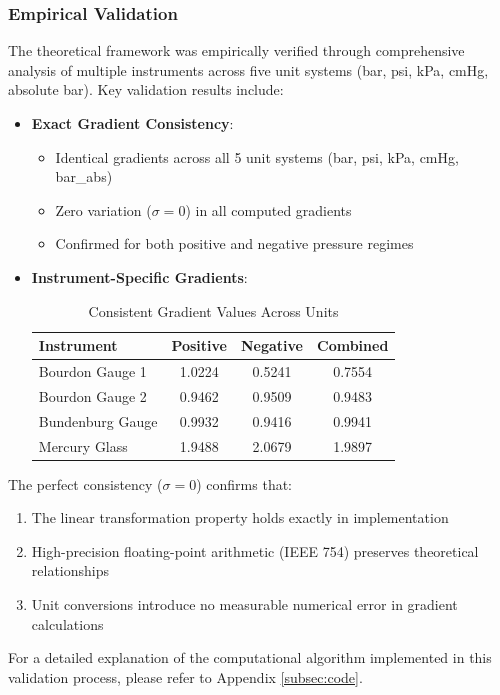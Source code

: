 \documentclass{article}
\begin{document}
\subsubsection{Empirical Validation}\label{empirical-validation}
The theoretical framework was empirically verified through comprehensive analysis of multiple instruments across five unit systems (bar, psi, kPa, cmHg, absolute bar). Key validation results include:
\begin{itemize}
	\item \textbf{Exact Gradient Consistency}:
	\begin{itemize}
		\item Identical gradients across all 5 unit systems (bar, psi, kPa, cmHg, bar\_abs)
		\item Zero variation ($\sigma = 0$) in all computed gradients
		\item Confirmed for both positive and negative pressure regimes
	\end{itemize}
	
	\item \textbf{Instrument-Specific Gradients}:
	\begin{table}[h]
		\centering
		\begin{tabular}{lccc}
			\toprule
			Instrument & Positive & Negative & Combined \\
			\midrule
			Bourdon Gauge 1 & 1.0224 & 0.5241 & 0.7554 \\
			Bourdon Gauge 2 & 0.9462 & 0.9509 & 0.9483 \\
			Bundenburg Gauge & 0.9932 & 0.9416 & 0.9941 \\
			Mercury Glass & 1.9488 & 2.0679 & 1.9897 \\
			\bottomrule
		\end{tabular}
		\caption{Consistent Gradient Values Across Units}
		\label{Consistent Gradient Values Across Units}
	\end{table}
\end{itemize}\vspace{-1em}
The perfect consistency ($\sigma = 0$) confirms that:
\begin{enumerate}[itemsep=-0.7mm]
	\item The linear transformation property holds exactly in implementation
	\item High-precision floating-point arithmetic (IEEE 754) preserves theoretical relationships
	\item Unit conversions introduce no measurable numerical error in gradient calculations
\end{enumerate}
For a detailed explanation of the computational algorithm implemented in this validation process, please refer to Appendix \ref{subsec:code}.
	\newpage\restoregeometry
	
\end{document}

